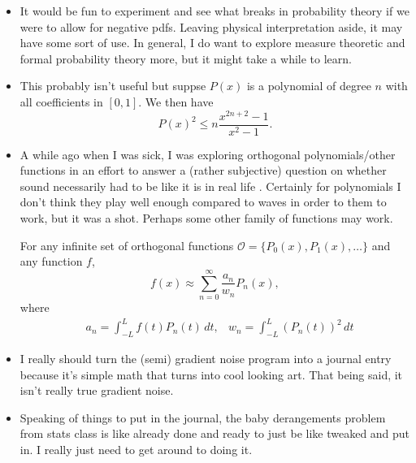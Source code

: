 \begin{itemize}
    \item It would be fun to experiment and see what breaks in probability
        theory if we were to allow for negative pdfs. Leaving physical
        interpretation aside, it may have some sort of use. In general, I do
        want to explore measure theoretic and formal probability theory more,
        but it might take a while to learn.
        
    \item This probably isn't useful but suppse \( P(x) \) is a polynomial of
        degree \( n \) with all coefficients in \( [0, 1] \). We then have
        \[
            P(x)^2 \leqslant n \frac{x^{2n + 2} - 1}{x^2 - 1}
        .\]

    \item A while ago when I was sick, I was exploring orthogonal
        polynomials/other functions in an effort to answer a (rather
        subjective) question on whether sound necessarily had to be like it is
        in real life . Certainly for polynomials I don't think they play well
        enough compared to waves in order to them to work, but it was a shot.
        Perhaps some other family of functions may work.
        \begin{blackbox}
            For any infinite set of orthogonal functions \( \mathcal{O} = \{ P_0 (x), P_1(x), \ldots \} \) and any function \( f \),
            \[
                f(x) \approx \sum_{n = 0}^\infty \frac{a_n}{w_n} P_n (x)
            ,\]
            where
            \begin{align*}
                &a_n = \int_{-L}^{L} f(t) P_n (t) \, dt,
                & w_n = \int_{-L}^{L} \left( P_n (t) \right)^2 \, dt
            \end{align*}
        \end{blackbox}

    \item I really should turn the (semi) gradient noise program into a journal
        entry because it's simple math that turns into cool looking art. That
        being said, it isn't really true gradient noise.

    \item Speaking of things to put in the journal, the baby derangements
        problem from stats class is like already done  and ready to
        just be like tweaked and put in. I really just need to get around to
        doing it.


\end{itemize}
